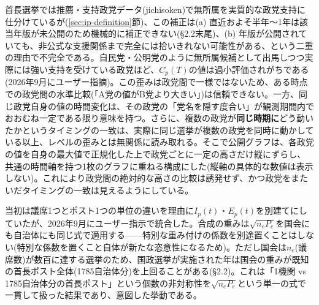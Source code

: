 \documentclass[a4paper,11pt]{ltjsarticle}
\begin{document}
\begin{description}[leftmargin=1em,style=nextline]
  \item[グラフは政党ごとに高さを正規化し、縦にずらして1枚に重ねる(縦軸の数値は示さない)。] 首長選挙では推薦・支持政党データ(jichisoken)で無所属を実質的な政党支持に仕分けているが(\ref{sec:ip-definition}節)、この補正は(a) 直近およそ半年〜1年は該当年版が未公開のため機械的に補正できない(\S2.2末尾)、(b) 年版が公開されていても、非公式な支援関係まで完全には拾いきれない可能性がある、という二重の理由で不完全である。自民党・公明党のように無所属候補として出馬しつつ実際には強い支持を受けている政党ほど、$C_p(T)$の値は過小評価されがちである(2026年9月にユーザー指摘)。この歪みは政党間で一様ではないため、ある時点での政党間の水準比較(「A党の値がB党より大きい」)は信頼できない。一方、同じ政党自身の値の時間変化は、その政党の「党名を隠す度合い」が観測期間内でおおむね一定である限り意味を持つ。さらに、複数の政党が\textbf{同じ時期に}どう動いたかというタイミングの一致は、実際に同じ選挙が複数の政党を同時に動かしている以上、レベルの歪みとは無関係に読み取れる。そこで公開グラフは、各政党の値を自身の最大値で正規化した上で政党ごとに一定の高さだけ縦にずらし、共通の時間軸を持つ1枚のグラフに重ねる構成にした(縦軸の具体的な数値は表示しない)。これにより政党間の絶対的な高さの比較は誘発せず、かつ政党をまたいだタイミングの一致は見えるようにしている。

  \item[議会(国会)と首長を1つの合成指数$C_p(T)$に統合した。] 当初は議席1つとポスト1つの単位の違いを理由に$I_p(t)$・$E_p(t)$を別建てにしていたが、2026年9月にユーザー指示で統合した。合成の重みは$\sqrt{n_eP_e}$を国会にも自治体にも同じ式で適用する——特別な重み付けの係数を別途置くことはしない(特別な係数を置くこと自体が新たな恣意性になるため)。ただし国会は$n_e$(議席数)が数百に達する選挙のため、国政選挙が実施された年は国会の重みが既知の首長ポスト全体(1785自治体分)を上回ることがある(\S2.2)。これは「1機関 vs 1785自治体分の首長ポスト」という個数の非対称性を$\sqrt{n_eP_e}$という単一の式で一貫して扱った結果であり、意図した挙動である。


\end{description}
\end{document}
